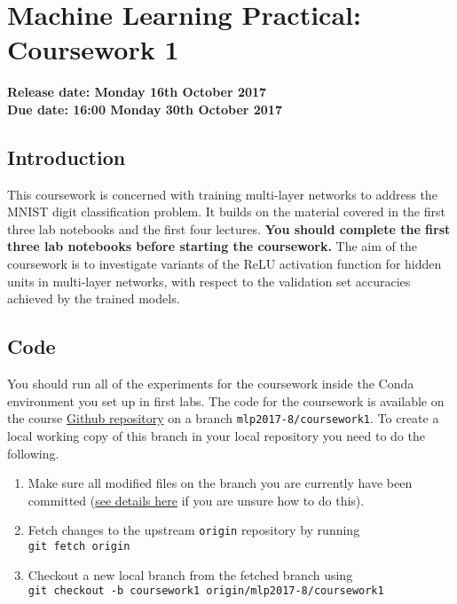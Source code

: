 \documentclass[11pt,]{article}
\author{}
\date{}
\begin{document}
\section{Machine Learning Practical: Coursework
1}
\label{sec:machine-learning-practical-coursework-1}

\textbf{Release date: Monday 16th October 2017}\\
\textbf{Due date: 16:00 Monday 30th October 2017}

\subsection{Introduction}
\label{sec:introduction}
This coursework is concerned with training multi-layer networks to
address the MNIST digit classification problem. It builds on the
material covered in the first three lab notebooks and the first four
lectures. \textbf{You should complete the first three lab
notebooks before starting the coursework.} The aim of the coursework is
to investigate variants of the ReLU activation function for hidden units 
in multi-layer networks, with respect to the validation set accuracies 
achieved by the trained models.


 


\subsection{Code}
\label{sec:code}

You should run all of the experiments for the coursework inside the
Conda environment you set up in first labs.  The code for the coursework is available on the course
\href{https://github.com/CSTR-Edinburgh/mlpractical/}{Github repository}
on a branch \texttt{mlp2017-8/coursework1}. To create a local working
copy of this branch in your local repository you need to do the
following.

\begin{enumerate}
\def\labelenumi{\arabic{enumi}.}
\itemsep1pt\parskip0pt
\item
  Make sure all modified files on the branch you are currently have been
  committed
  (\href{https://github.com/CSTR-Edinburgh/mlpractical/blob/mlp2017-8/master/notes/getting-started-in-a-lab.md}{see
  details here} if you are unsure how to do this).
\item
  Fetch changes to the upstream \texttt{origin} repository by running\\
  \texttt{git fetch origin}
\item
  Checkout a new local branch from the fetched branch using\\
  \texttt{git checkout -b coursework1 origin/mlp2017-8/coursework1}
\end{enumerate}
\end{document}
